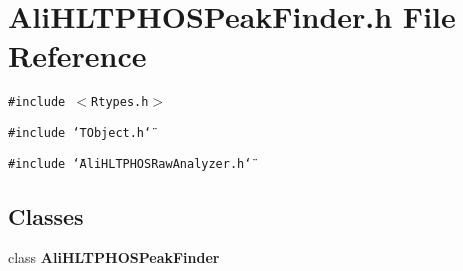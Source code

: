\section{Ali\-HLTPHOSPeak\-Finder.h File Reference}
\label{AliHLTPHOSPeakFinder_8h}
{\tt \#include $<$Rtypes.h$>$}\par
{\tt \#include \char`\"{}TObject.h\char`\"{}}\par
{\tt \#include \char`\"{}Ali\-HLTPHOSRaw\-Analyzer.h\char`\"{}}\par
\subsection*{Classes}
\begin{CompactItemize}
\item 
class {\bf Ali\-HLTPHOSPeak\-Finder}
\end{CompactItemize}
